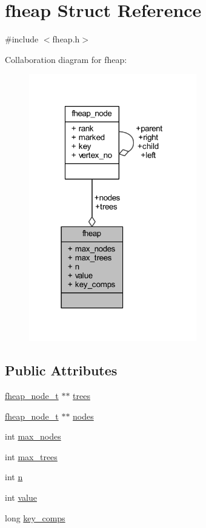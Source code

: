 \hypertarget{structfheap}{}\section{fheap Struct Reference}
\label{structfheap}


{\ttfamily \#include $<$fheap.\+h$>$}



Collaboration diagram for fheap\+:\nopagebreak
\begin{figure}[H]
\begin{center}
\leavevmode
\includegraphics[width=207pt]{structfheap__coll__graph}
\end{center}
\end{figure}
\subsection*{Public Attributes}
\begin{DoxyCompactItemize}
\item 
\mbox{\hyperlink{fheap_8h_a287241d6991f4f1027058c066fc7003e}{fheap\+\_\+node\+\_\+t}} $\ast$$\ast$ \mbox{\hyperlink{structfheap_afc06f9768708fb48c24e7a788c108fb7}{trees}}
\item 
\mbox{\hyperlink{fheap_8h_a287241d6991f4f1027058c066fc7003e}{fheap\+\_\+node\+\_\+t}} $\ast$$\ast$ \mbox{\hyperlink{structfheap_ab78171d6b052efe35f0ff7f6d9fd8f99}{nodes}}
\item 
int \mbox{\hyperlink{structfheap_a05a5bfb7e168b7aacb49e998a87f4d6f}{max\+\_\+nodes}}
\item 
int \mbox{\hyperlink{structfheap_a496e0271cc82f25d8c53588b7982954b}{max\+\_\+trees}}
\item 
int \mbox{\hyperlink{structfheap_af369ea8f1202800c582fe570803fea9f}{n}}
\item 
int \mbox{\hyperlink{structfheap_a04d7238a058ccbd0beb8e807d212f348}{value}}
\item 
long \mbox{\hyperlink{structfheap_ab593aa07617376fafd3d1c378d5d73d9}{key\+\_\+comps}}
\end{DoxyCompactItemize}


